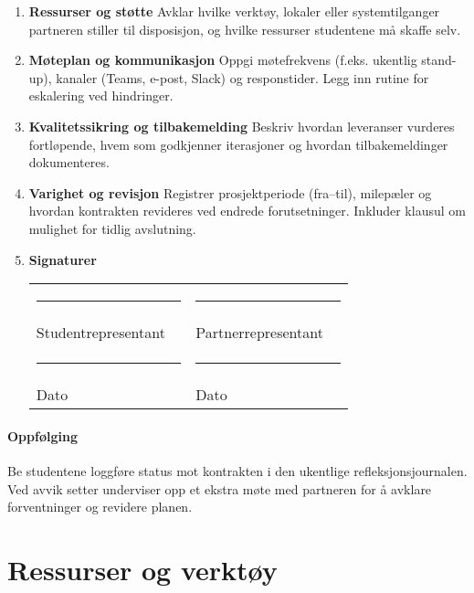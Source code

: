 \begin{enumerate}
    \item \textbf{Ressurser og støtte}\newline
    Avklar hvilke verktøy, lokaler eller systemtilganger partneren stiller til disposisjon, og hvilke ressurser studentene må skaffe selv.

    \item \textbf{Møteplan og kommunikasjon}\newline
    Oppgi møtefrekvens (f.eks. ukentlig stand-up), kanaler (Teams, e-post, Slack) og responstider. Legg inn rutine for eskalering ved hindringer.

    \item \textbf{Kvalitetssikring og tilbakemelding}\newline
    Beskriv hvordan leveranser vurderes fortløpende, hvem som godkjenner iterasjoner og hvordan tilbakemeldinger dokumenteres.

    \item \textbf{Varighet og revisjon}\newline
    Registrer prosjektperiode (fra--til), milepæler og hvordan kontrakten revideres ved endrede forutsetninger. Inkluder klausul om mulighet for tidlig avslutning.

    \item \textbf{Signaturer}\newline
    \begin{tabular}{p{0.45\linewidth}p{0.45\linewidth}}
        \rule{0.45\linewidth}{0.4pt} & \rule{0.45\linewidth}{0.4pt}\\
        Studentrepresentant & Partnerrepresentant\\[1.0em]
        \rule{0.45\linewidth}{0.4pt} & \rule{0.45\linewidth}{0.4pt}\\
        Dato & Dato\\
    \end{tabular}
\end{enumerate}

\paragraph{Oppfølging}
Be studentene loggføre status mot kontrakten i den ukentlige refleksjonsjournalen. Ved avvik setter underviser opp et ekstra møte med partneren for å avklare forventninger og revidere planen.

\section{Ressurser og verktøy}
